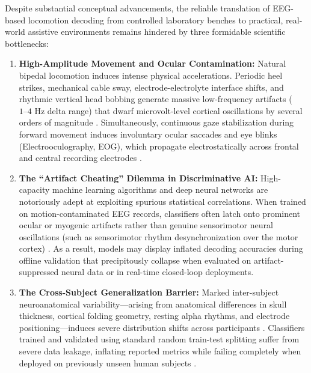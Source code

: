 \documentclass[review,12pt]{elsarticle}
\begin{document}
Despite substantial conceptual advancements, the reliable translation of EEG-based locomotion decoding from controlled laboratory benches to practical, real-world assistive environments remains hindered by three formidable scientific bottlenecks:

\begin{enumerate}
    \item \textbf{High-Amplitude Movement and Ocular Contamination:} Natural bipedal locomotion induces intense physical accelerations. Periodic heel strikes, mechanical cable sway, electrode-electrolyte interface shifts, and rhythmic vertical head bobbing generate massive low-frequency artifacts ($1\text{--}4\text{ Hz}$ delta range) that dwarf microvolt-level cortical oscillations by several orders of magnitude \cite{gwin2011removal, castermans2014accidental}. Simultaneously, continuous gaze stabilization during forward movement induces involuntary ocular saccades and eye blinks (Electrooculography, EOG), which propagate electrostatically across frontal and central recording electrodes \cite{fatourechi2007ocular}.

    \item \textbf{The ``Artifact Cheating'' Dilemma in Discriminative AI:} High-capacity machine learning algorithms and deep neural networks are notoriously adept at exploiting spurious statistical correlations. When trained on motion-contaminated EEG records, classifiers often latch onto prominent ocular or myogenic artifacts rather than genuine sensorimotor neural oscillations (such as sensorimotor rhythm desynchronization over the motor cortex) \cite{schirrmeister2017eeg, tanner2023artifacts}. As a result, models may display inflated decoding accuracies during offline validation that precipitously collapse when evaluated on artifact-suppressed neural data or in real-time closed-loop deployments.

    \item \textbf{The Cross-Subject Generalization Barrier:} Marked inter-subject neuroanatomical variability---arising from anatomical differences in skull thickness, cortical folding geometry, resting alpha rhythms, and electrode positioning---induces severe distribution shifts across participants \cite{jayaram2016transfer, lotte2018review}. Classifiers trained and validated using standard random train-test splitting suffer from severe data leakage, inflating reported metrics while failing completely when deployed on previously unseen human subjects \cite{saeedi2023validation}.
\end{enumerate}
\end{document}
